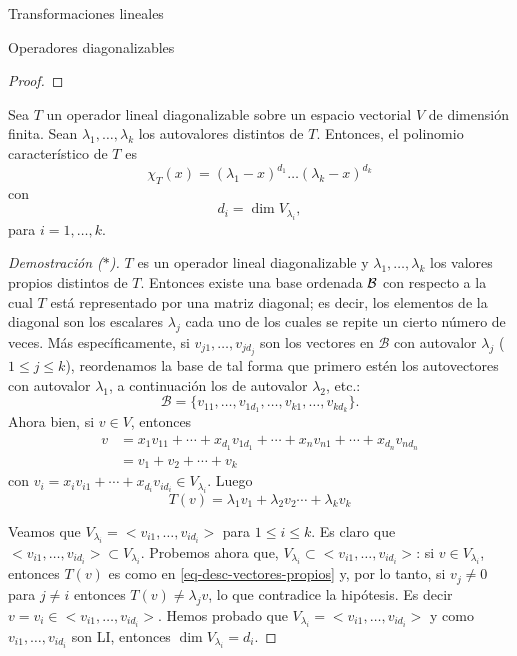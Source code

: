 \begin{chapter}{Transformaciones lineales}
\begin{section}{Operadores diagonalizables}
\begin{proof}
        \end{proof}
    
        \begin{proposicion}
             Sea $T$ un operador lineal diagonalizable sobre un espacio vectorial $V$ de dimensión finita. Sean $\lambda_1,\ldots,\lambda_k$ los autovalores distintos de $T$. Entonces,  el  polinomio característico de $T$ es
                 $$
                 \chi_T(x) = (\lambda_1 -x)^{d_1}\ldots(\lambda_k- x)^{d_k}
                 $$
                 con
                 $$
                 d_i =  \dim V_{\lambda_i},
                 $$
                 para  $i=1, \ldots, k$.
        \end{proposicion}
        \begin{proof}[Demostración ($*$)]
            $T$ es un operador lineal diagonalizable y $\lambda_1,\ldots,\lambda_k$ los valores propios distintos de $T$. Entonces existe una base ordenada $\mathcal{B}$ con respecto a la cual $T$ está representado por una matriz diagonal; es decir, los elementos de la diagonal son los escalares $\lambda_j$ cada uno de los cuales se repite un cierto número de veces. Más específicamente, si
             $v_{j1},\ldots,v_{jd_j}$ son los vectores en $\mathcal{B}$ con autovalor $\lambda_j$ ($1 \le j \le k$),  reordenamos la base de tal forma que primero estén los autovectores con autovalor $\lambda_1$, a continuación los de autovalor $\lambda_2$, etc.: 
            \begin{equation*}
                \mathcal{B} = \{v_{11},\ldots,v_{1d_1},\ldots,v_{k1},\ldots,v_{kd_k}\}. 
            \end{equation*}
            Ahora bien,  si $v \in V$,  entonces 
            \begin{align*}
            v &=x_1v_{11}+\cdots+x_{d_1}v_{1d_1}+\cdots+x_nv_{n1}+\cdots+x_{d_n}v_{nd_n} \\
            &= v_1 + v_2 +\cdots + v_k
            \end{align*}
            con $v_i = x_iv_{i1}+\cdots+x_{d_i}v_{id_i} \in V_{\lambda_i}$. Luego
            \begin{equation}\label{eq-desc-vectores-propios}
                T(v)  =\lambda_1v_1+\lambda_2v_2\cdots+\lambda_kv_k
            \end{equation} 
            
            Veamos que $V_{\lambda_i} = <v_{i1},\ldots,v_{id_i}>$ para $1 \le i \le k$. Es claro que  $<v_{i1},\ldots,v_{id_i}> \subset V_{\lambda_i}$. Probemos  ahora que,  $V_{\lambda_i} \subset <v_{i1},\ldots,v_{id_i}>$: si  $v \in V_{\lambda_i}$,  entonces $T(v)$ es como en \eqref{eq-desc-vectores-propios} y, por lo tanto, si $v_j \ne 0$ para $j\not=i$ entonces $T(v) \ne \lambda_j v$, lo que contradice la hipótesis. Es decir $v = v_i \in <v_{i1},\ldots,v_{id_i}>$. Hemos probado que    $V_{\lambda_i} = <v_{i1},\ldots,v_{id_i}>$ y como $v_{i1},\ldots,v_{id_i}$ son LI, entonces $\dim V_{\lambda_i} = d_i$.
            

\end{proof}
\end{section}
\end{chapter}
